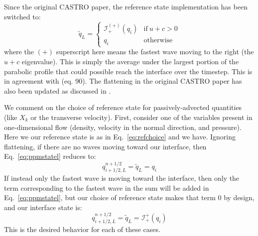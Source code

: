 \documentclass{emulateapj}
\begin{document}
Since the original CASTRO paper, the reference state implementation
has been switched to:
\begin{equation}
\label{eq:refchoice}
\tilde{q}_L = \left \{ \begin{array}{cc}
       \mathcal{I}_+^{(+)}(q_i) & \mathrm{if~} u + c > 0 \\
       q_i                    & \mathrm{otherwise}
\end{array}
\right .
\end{equation}
where the $(+)$ superscript here means the fastest wave moving to the right
(the $u+c$ eigenvalue).   This is simply the average under the largest
portion of the parabolic profile that could possible reach the interface 
over the timestep.  This is
in agreement with \citet{ppmunsplit} (eq. 90).  The flattening
in the original CASTRO paper has also been updated as discussed
in \citet{zingalekatz:2015}.

We comment on the choice of reference state for passively-advected
quantities (like $X_k$ or the transverse velocity).
First, consider one of the variables present in one-dimensional flow
(density, velocity in the normal direction, and pressure).  Here we
our reference state is as in Eq.~\ref{eq:refchoice} and we have.
Ignoring flattening, if there are no waves moving toward our
interface, then Eq.~\ref{eq:ppmstatel} reduces to:
\begin{equation}
q_{i+1/2,L}^{n+1/2} = \tilde{q}_L = q_i
\end{equation}
If instead only the fastest wave is moving toward the interface, then
only the term corresponding to the fastest wave in the sum will be
added in Eq.~\ref{eq:ppmstatel}, but our choice of reference state makes
that term 0 by design, and our interface state is:
\begin{equation}
q_{i+1/2,L}^{n+1/2} = \tilde{q}_L = \mathcal{I}_+^{+}(q_i)
\end{equation}
This is the desired behavior for each of these cases. 
\end{document}
